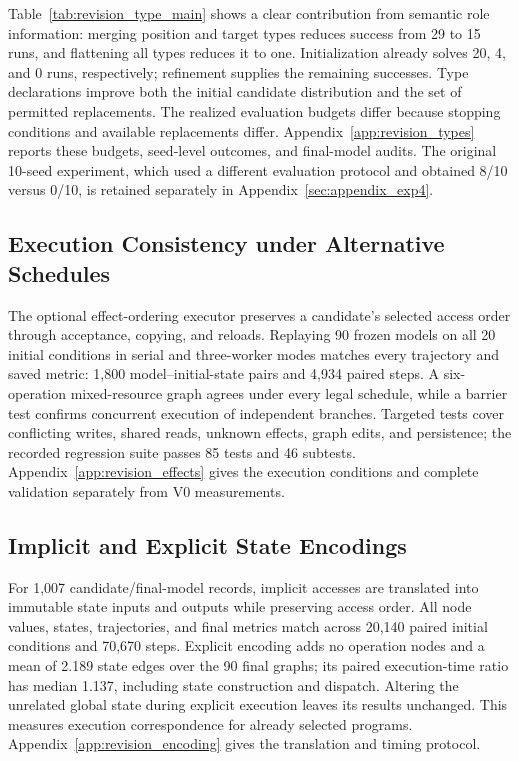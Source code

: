 Table~\ref{tab:revision_type_main} shows a clear contribution from semantic role information: merging position and target types reduces success from 29 to 15 runs, and flattening all types reduces it to one. Initialization already solves 20, 4, and 0 runs, respectively; refinement supplies the remaining successes. Type declarations improve both the initial candidate distribution and the set of permitted replacements. The realized evaluation budgets differ because stopping conditions and available replacements differ. Appendix~\ref{app:revision_types} reports these budgets, seed-level outcomes, and final-model audits. The original 10-seed experiment, which used a different evaluation protocol and obtained 8/10 versus 0/10, is retained separately in Appendix~\ref{sec:appendix_exp4}.

\subsection{Execution Consistency under Alternative Schedules}
\label{subsec:execution_consistency}
The optional effect-ordering executor preserves a candidate's selected access order through acceptance, copying, and reloads. Replaying 90 frozen models on all 20 initial conditions in serial and three-worker modes matches every trajectory and saved metric: 1,800 model--initial-state pairs and 4,934 paired steps. A six-operation mixed-resource graph agrees under every legal schedule, while a barrier test confirms concurrent execution of independent branches. Targeted tests cover conflicting writes, shared reads, unknown effects, graph edits, and persistence; the recorded regression suite passes 85 tests and 46 subtests. Appendix~\ref{app:revision_effects} gives the execution conditions and complete validation separately from V0 measurements.

\subsection{Implicit and Explicit State Encodings}
For 1,007 candidate/final-model records, implicit accesses are translated into immutable state inputs and outputs while preserving access order. All node values, states, trajectories, and final metrics match across 20,140 paired initial conditions and 70,670 steps. Explicit encoding adds no operation nodes and a mean of 2.189 state edges over the 90 final graphs; its paired execution-time ratio has median 1.137, including state construction and dispatch. Altering the unrelated global state during explicit execution leaves its results unchanged. This measures execution correspondence for already selected programs. Appendix~\ref{app:revision_encoding} gives the translation and timing protocol.

